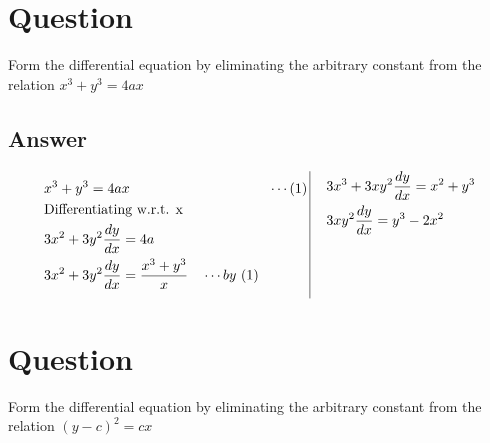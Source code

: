 \documentclass[17pt]{extarticle}
\begin{document}
\noindent
\begin{fleqn} 


\section{Question} 
Form the differential equation by eliminating the arbitrary constant from the relation $ x^3 + y^3 = 4ax$

\subsection*{Answer}
\begin{equation} \nonumber
\begin{alignedat}{4}
&  x^3 + y^3 = 4ax    \hspace{3.5cm} \cdots (1)  \\
& \text{Differentiating w.r.t. x \ }\\
& 3x^2 + 3y^2 \frac{dy}{dx}= 4a \\
& 3x^2 + 3y^2\frac{dy}{dx}= \frac{x^3+y^3}{x} \quad \cdots by \ (1) \quad \\
\end{alignedat}
\,
\vrule
\quad
\, 
\begin{alignedat}{4}
& 3x^3 + 3xy^2\frac{dy}{dx}=  x^2+y^3\\
& 3xy^2\frac{dy}{dx}=  y^3-2x^2\\& \\
& \\
& \\
\end{alignedat}
\end{equation}

\section{Question} 
Form the differential equation by eliminating the arbitrary constant from the relation $ (y-c)^2 = cx $


\end{fleqn}
\end{document}
